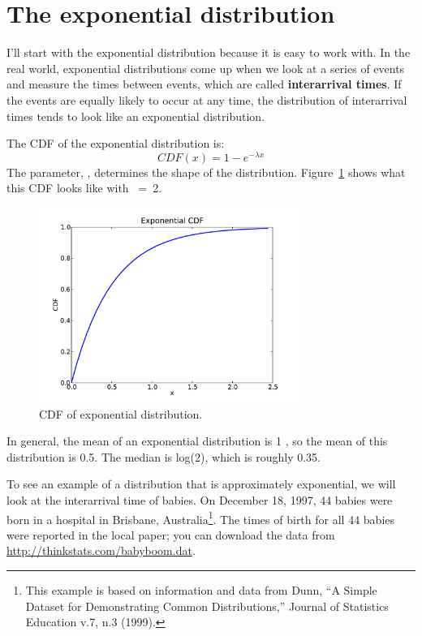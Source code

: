 \documentclass[12pt]{book}
\begin{document}
\section{The exponential distribution}

I'll start with the exponential distribution because it is
easy to work with.  In the real world, exponential distributions
come up when we look at a series of events and measure the
times between events, which are called {\bf interarrival times}.
If the events are equally likely to occur at any time, the distribution
of interarrival times tends to look like an exponential distribution.

The CDF of the exponential distribution is:
%
\[ CDF(x) = 1 - e^{-\lambda x} \]
%
The parameter, \mylambda, determines the shape of the
distribution.  Figure~\ref{expo_cdf} shows what this CDF looks like with
\mylambda~=~2.


\begin{figure}
\centerline{\includegraphics[height=2.5in]{figs/expo_cdf.pdf}}
\caption{CDF of exponential distribution.}
\label{expo_cdf}
\end{figure}

In general, the mean of an exponential distribution is 1\mydivide
\mylambda, so the mean of this distribution is 0.5.  The median is
log(2)\mydivide\mylambda, which is roughly 0.35.  
  

To see an example of a distribution that is approximately exponential,
we will look at the interarrival time of babies.
On December 18, 1997, 44 babies were born in a hospital in Brisbane,
Australia\footnote{This example is based on information and data from
  Dunn, ``A Simple Dataset for Demonstrating Common Distributions,''
  Journal of Statistics Education v.7, n.3 (1999).}.  The times of
birth for all 44 babies were reported in the local paper; you can
download the data from \url{http://thinkstats.com/babyboom.dat}.
\end{document}
